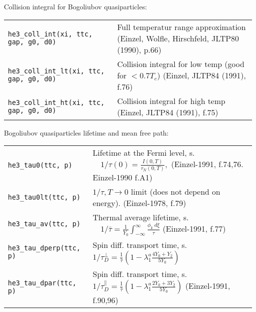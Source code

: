 \documentclass[a4paper]{article}
\begin{document}
Collision integral for Bogoliubov quasiparticles:

\medskip
\noindent\begin{tabular}{lp{12.5cm}}
\tt he3\_coll\_int(xi, ttc, gap, g0, d0) &
   Full temperatur range approximation\newline
   {\small (Einzel, Wolfle, Hirschfeld, JLTP80 (1990), p.66)}\\
\tt he3\_coll\_int\_lt(xi, ttc, gap, g0, d0) &
   Collision integral for low temp (good for $< 0.7 T_c$)\newline
   {\small (Einzel, JLTP84 (1991), f.76)}\\
\tt he3\_coll\_int\_ht(xi, ttc, gap, g0, d0) &
   Collision integral for high temp\newline
   {\small (Einzel, JLTP84 (1991), f.75)}\\
\end{tabular}
\medskip

Bogoliubov quasiparticles lifetime and mean free path:

\medskip
\noindent\begin{tabular}{lp{12.5cm}}
\tt he3\_tau0(ttc, p)      & Lifetime at the Fermi level, s.
                           $\displaystyle\quad 1/\tau(0) = \frac{I (0,T)}{\tau_N(0,T)},$\newline
                            {\small(Einzel-1991, f.74,76. Einzel-1990 f.A1)}\\

\tt he3\_tau0lt(ttc, p)    & $\displaystyle 1/\tau, T\rightarrow0$ limit (does not depend on energy).
                            {\small(Einzel-1978, f.79)}\\

\tt he3\_tau\_av(ttc, p)   & Thermal average lifetime, s.
                           $\displaystyle\quad 1/\bar\tau = \frac{1}{Y_0}
                           \int_{-\infty}^{\infty} \frac{\phi_k\ d\xi}{\tau}$\newline
                            {\small(Einzel-1991, f.77)}\\
\tt he3\_tau\_dperp(ttc, p) & Spin diff. transport time, s.
                           \ $\displaystyle 1/\tau_D^\perp = \frac{1}{\bar\tau}
                            \left(1-\lambda_1^a \frac{4Y_0 + Y_2}{5Y_0}\right)$ \\

\tt he3\_tau\_dpar(ttc, p) & Spin diff. transport time, s.
                        \ $\displaystyle 1/\tau_D^\parallel = \frac{1}{\bar\tau}
                            \left(1-\lambda_1^a \frac{2Y_0 + 3Y_2}{5Y_0}\right)$\newline
                            {\small(Einzel-1991, f.90,96)}\\
\end{tabular}
\medskip
\end{document}

